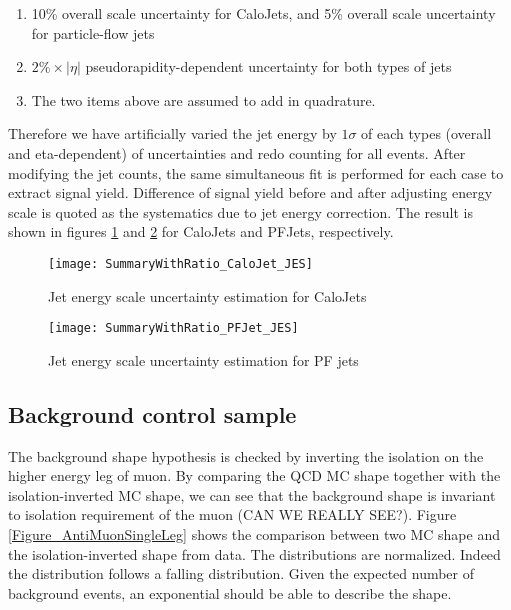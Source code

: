 \documentclass{cmspaper}
\begin{document}
\begin{enumerate}
\item 10\% overall scale uncertainty for CaloJets, and 5\% overall
  scale uncertainty for particle-flow jets
\item $2\% \times |\eta|$ pseudorapidity-dependent uncertainty for
  both types of jets
\item The two items above are assumed to add in quadrature.
\end{enumerate}

Therefore we have artificially varied the jet energy by $1 \sigma$ of
each types (overall and eta-dependent) of uncertainties and redo
counting for all events.  After modifying the jet counts, the same
simultaneous fit is performed for each case to extract signal yield.
Difference of signal yield before and after adjusting energy scale is
quoted as the systematics due to jet energy correction.  The result is
shown in figures \ref{Figure_CaloJetJES} and \ref{Figure_PFJetJES} for
CaloJets and PFJets, respectively.

\begin{figure}[hbtp]
\begin{center}
\texttt{[image: SummaryWithRatio\_CaloJet\_JES]}
\caption{Jet energy scale uncertainty estimation for CaloJets}
\label{Figure_CaloJetJES}
\end{center}
\end{figure}

\begin{figure}[hbtp]
\begin{center}
\texttt{[image: SummaryWithRatio\_PFJet\_JES]}
\caption{Jet energy scale uncertainty estimation for PF jets}
\label{Figure_PFJetJES}
\end{center}
\end{figure}


\subsection{Background control sample}

The background shape hypothesis is checked by inverting the isolation
on the higher energy leg of muon.  By comparing the QCD MC shape
together with the isolation-inverted MC shape, we can see that the
background shape is invariant to isolation requirement of the muon
(CAN WE REALLY SEE?).  Figure \ref{Figure_AntiMuonSingleLeg}
shows the comparison between two MC shape and the isolation-inverted
shape from data.  The distributions are normalized.  Indeed the
distribution follows a falling distribution.  Given the expected
number of background events, an exponential should be able to describe
the shape.
\end{document}
